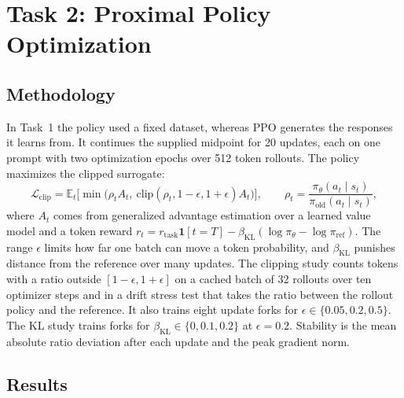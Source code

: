 \documentclass{article}
\begin{document}
\section{Task 2: Proximal Policy Optimization}
\label{sec:task2}

\subsection{Methodology}

In Task~1 the policy used a fixed dataset, whereas PPO generates the responses it
learns from. It continues the supplied midpoint for 20 updates, each on one
prompt with two optimization epochs over 512 token rollouts. The policy maximizes the
clipped surrogate:
\begin{equation}
  \mathcal{L}_{\text{clip}} = \mathbb{E}_t\big[\min\big(\rho_t A_t,\ \mathrm{clip}(\rho_t,1-\epsilon,1+\epsilon)A_t\big)\big],\qquad \rho_t=\frac{\pi_\theta(a_t\mid s_t)}{\pi_{\text{old}}(a_t\mid s_t)},
  \label{eq:ppo}
\end{equation}
where $A_t$ comes from generalized advantage estimation
\citep{schulman2016high} over a learned value model and a token reward
$r_t=r_{\text{task}}\mathbf{1}[t=T]-\beta_{\text{KL}}(\log\pi_\theta-\log\pi_{\text{ref}})$.
The range $\epsilon$ limits how far one batch can move a token probability,
and $\beta_{\text{KL}}$ punishes distance from the reference over many updates.
The clipping study counts
tokens with a ratio outside $[1-\epsilon,1+\epsilon]$ on a cached batch of 32
rollouts over ten optimizer steps and in a drift stress test that takes the
ratio between the rollout policy and the reference. It also trains eight
update forks for $\epsilon\in\{0.05,0.2,0.5\}$. The KL study trains forks for
$\beta_{\text{KL}}\in\{0,0.1,0.2\}$ at $\epsilon=0.2$. Stability is the mean absolute ratio deviation after each update and the peak gradient norm.

\subsection{Results}
\end{document}

